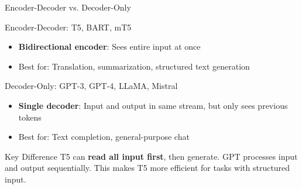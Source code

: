 \documentclass[aspectratio=169]{beamer}
\begin{document}
\begin{frame}{Encoder-Decoder vs. Decoder-Only}
\begin{block}{Encoder-Decoder: T5, BART, mT5}
\begin{itemize}
  \item \textbf{Bidirectional encoder}: Sees entire input at once
  \item Best for: Translation, summarization, structured text generation
\end{itemize}
\end{block}

\begin{block}{Decoder-Only: GPT-3, GPT-4, LLaMA, Mistral}
\begin{itemize}
  \item \textbf{Single decoder}: Input and output in same stream, but only sees previous tokens
  \item Best for: Text completion, general-purpose chat
\end{itemize}
\end{block}

\begin{alertblock}{Key Difference}
T5 can \textbf{read all input first}, then generate. GPT processes input and output sequentially. This makes T5 more efficient for tasks with structured input.
\end{alertblock}
\end{frame}
\end{document}

